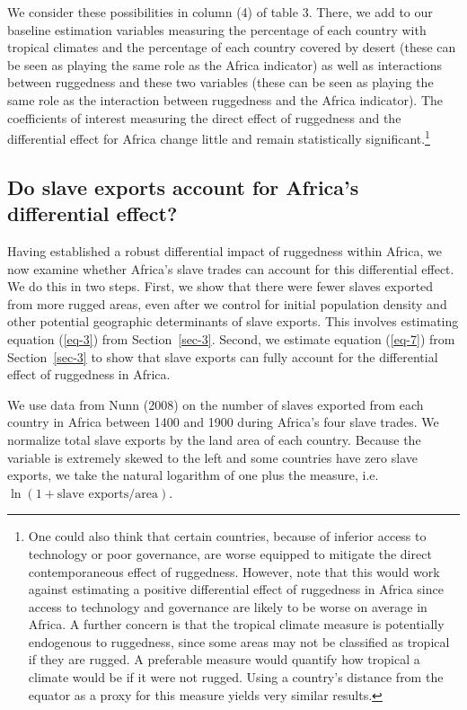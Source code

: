 \documentclass[
  letterpaper,
  DIV=11,
  numbers=noendperiod]{scrartcl}
\begin{document}
We consider these possibilities in column (4) of table 3. There, we add
to our baseline estimation variables measuring the percentage of each
country with tropical climates and the percentage of each country
covered by desert (these can be seen as playing the same role as the
Africa indicator) as well as interactions between ruggedness and these
two variables (these can be seen as playing the same role as the
interaction between ruggedness and the Africa indicator). The
coefficients of interest measuring the direct effect of ruggedness and
the differential effect for Africa change little and remain
statistically significant.\footnote{One could also think that certain
  countries, because of inferior access to technology or poor
  governance, are worse equipped to mitigate the direct contemporaneous
  effect of ruggedness. However, note that this would work against
  estimating a positive differential effect of ruggedness in Africa
  since access to technology and governance are likely to be worse on
  average in Africa. A further concern is that the tropical climate
  measure is potentially endogenous to ruggedness, since some areas may
  not be classified as tropical if they are rugged. A preferable measure
  would quantify how tropical a climate would be if it were not rugged.
  Using a country's distance from the equator as a proxy for this
  measure yields very similar results.}

\subsection{Do slave exports account for Africa's differential
effect?}\label{sec-5}

Having established a robust differential impact of ruggedness within
Africa, we now examine whether Africa's slave trades can account for
this differential effect. We do this in two steps. First, we show that
there were fewer slaves exported from more rugged areas, even after we
control for initial population density and other potential geographic
determinants of slave exports. This involves estimating equation
(\ref{eq-3}) from Section~\ref{sec-3}. Second, we estimate equation
(\ref{eq-7}) from Section~\ref{sec-3} to show that slave exports can
fully account for the differential effect of ruggedness in Africa.

We use data from Nunn (2008) on the number of slaves exported from each
country in Africa between 1400 and 1900 during Africa's four slave
trades. We normalize total slave exports by the land area of each
country. Because the variable is extremely skewed to the left and some
countries have zero slave exports, we take the natural logarithm of one
plus the measure, i.e.~\(\ln(1 + \text{slave exports} / \text{area})\).
\end{document}
